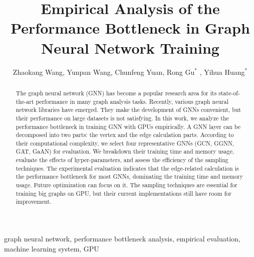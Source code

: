 \documentclass{elsarticle}
\begin{document}
\begin{frontmatter}

	\title{Empirical Analysis of the Performance Bottleneck in Graph Neural Network Training}
    \author{Zhaokang Wang, Yunpan Wang, Chunfeng Yuan, Rong Gu$^*$ , Yihua Huang$^*$ }
	\address{State Key Laboratory for Novel Software Technology, \\Department of Computer Science and Technology, Nanjing University, \\Nanjing 210023, China}

	\begin{abstract}
		The graph neural network (GNN) has become a popular research area for its state-of-the-art performance in many graph analysis tasks.
		Recently, various graph neural network libraries have emerged.
		They make the development of GNNs convenient, but their performance on large datasets is not satisfying.
		In this work, we analyze the performance bottleneck in training GNN with GPUs empirically.
		A GNN layer can be decomposed into two parts: the vertex and the edge calculation parts.
		According to their computational complexity, we select four representative GNNs (GCN, GGNN, GAT, GaAN) for evaluation.
		We breakdown their training time and memory usage, evaluate the effects of hyper-parameters, and assess the efficiency of the sampling techniques.  
		The experimental evaluation indicates that the edge-related calculation is the performance bottleneck for most GNNs, dominating the training time and memory usage.
		Future optimization can focus on it. 
		The sampling techniques are essential for training big graphs on GPU, but their current implementations still have room for improvement.
	\end{abstract}

	\begin{keyword}
		graph neural network, performance bottleneck analysis, empirical evaluation, machine learning system, GPU
	\end{keyword}

\end{frontmatter}

\linenumbers











\end{document}

